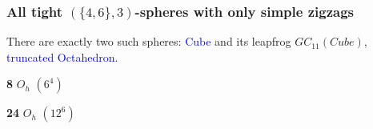 \documentclass{beamer}
\begin{document}
\begin{frame}\frametitle{All tight $(\{4,6\},3)$-spheres with only simple 
zigzags}

There are exactly two such spheres:
\textcolor{blue}{Cube} and its leapfrog  $GC_{11}(Cube)$, 
\textcolor{blue}{truncated
Octahedron}.
\begin{center}
\begin{minipage}{2.6cm}\centering
{}\par
{\bf 8} $O_h$ $(6^4)$
\end{minipage}
\begin{minipage}{2.8cm}
\centering
{}\par
{\bf 24}  $O_{h}$ $(12^6)$
\end{minipage}\end{center}
\pause


\end{frame}
\end{document}
